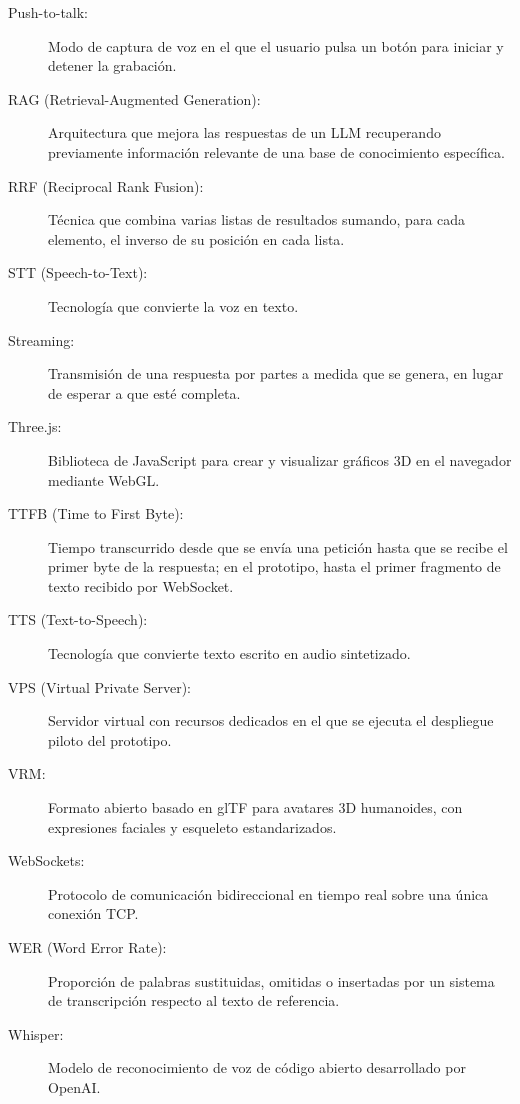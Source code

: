 \begin{description}
  \item[Push-to-talk:] Modo de captura de voz en el que el usuario pulsa un botón para iniciar y detener la grabación.
  \item[RAG (Retrieval-Augmented Generation):] Arquitectura que mejora las respuestas de un LLM recuperando previamente información relevante de una base de conocimiento específica.
  \item[RRF (Reciprocal Rank Fusion):] Técnica que combina varias listas de resultados sumando, para cada elemento, el inverso de su posición en cada lista.
  \item[STT (Speech-to-Text):] Tecnología que convierte la voz en texto.
  \item[Streaming:] Transmisión de una respuesta por partes a medida que se genera, en lugar de esperar a que esté completa.
  \item[Three.js:] Biblioteca de JavaScript para crear y visualizar gráficos 3D en el navegador mediante WebGL.
  \item[TTFB (Time to First Byte):] Tiempo transcurrido desde que se envía una petición hasta que se recibe el primer byte de la respuesta; en el prototipo, hasta el primer fragmento de texto recibido por WebSocket.
  \item[TTS (Text-to-Speech):] Tecnología que convierte texto escrito en audio sintetizado.
  \item[VPS (Virtual Private Server):] Servidor virtual con recursos dedicados en el que se ejecuta el despliegue piloto del prototipo.
  \item[VRM:] Formato abierto basado en glTF para avatares 3D humanoides, con expresiones faciales y esqueleto estandarizados.
  \item[WebSockets:] Protocolo de comunicación bidireccional en tiempo real sobre una única conexión TCP.
  \item[WER (Word Error Rate):] Proporción de palabras sustituidas, omitidas o insertadas por un sistema de transcripción respecto al texto de referencia.
  \item[Whisper:] Modelo de reconocimiento de voz de código abierto desarrollado por OpenAI.
\end{description}
